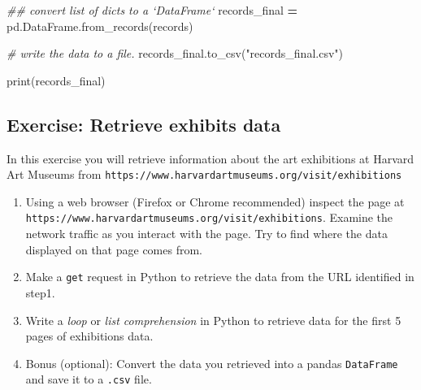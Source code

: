 \documentclass[]{book}
\newenvironment{Shaded}{\begin{snugshade}}{\end{snugshade}}
\newcommand{\StringTok}[1]{\textcolor[rgb]{0.31,0.60,0.02}{#1}}
\newcommand{\CommentTok}[1]{\textcolor[rgb]{0.56,0.35,0.01}{\textit{#1}}}
\newcommand{\OperatorTok}[1]{\textcolor[rgb]{0.81,0.36,0.00}{\textbf{#1}}}
\newcommand{\BuiltInTok}[1]{#1}
\newcommand{\NormalTok}[1]{#1}
\providecommand{\tightlist}{%
  \setlength{\itemsep}{0pt}\setlength{\parskip}{0pt}}
\begin{document}
\begin{Shaded}
\begin{Highlighting}[]
\CommentTok{## convert list of dicts to a `DataFrame`}
\NormalTok{records_final }\OperatorTok{=}\NormalTok{ pd.DataFrame.from_records(records)}
\end{Highlighting}
\end{Shaded}

\begin{Shaded}
\begin{Highlighting}[]
\CommentTok{# write the data to a file.}
\NormalTok{records_final.to_csv(}\StringTok{"records_final.csv"}\NormalTok{)}
\end{Highlighting}
\end{Shaded}

\begin{Shaded}
\begin{Highlighting}[]
\BuiltInTok{print}\NormalTok{(records_final)}
\end{Highlighting}
\end{Shaded}

\subsection{Exercise: Retrieve exhibits
data}\label{exercise-retrieve-exhibits-data}

In this exercise you will retrieve information about the art exhibitions
at Harvard Art Museums from
\texttt{https://www.harvardartmuseums.org/visit/exhibitions}

\begin{enumerate}
\def\labelenumi{\arabic{enumi}.}
\tightlist
\item
  Using a web browser (Firefox or Chrome recommended) inspect the page
  at \texttt{https://www.harvardartmuseums.org/visit/exhibitions}.
  Examine the network traffic as you interact with the page. Try to find
  where the data displayed on that page comes from.
\item
  Make a \texttt{get} request in Python to retrieve the data from the
  URL identified in step1.
\item
  Write a \emph{loop} or \emph{list comprehension} in Python to retrieve
  data for the first 5 pages of exhibitions data.
\item
  Bonus (optional): Convert the data you retrieved into a pandas
  \texttt{DataFrame} and save it to a \texttt{.csv} file.
\end{enumerate}
\end{document}
